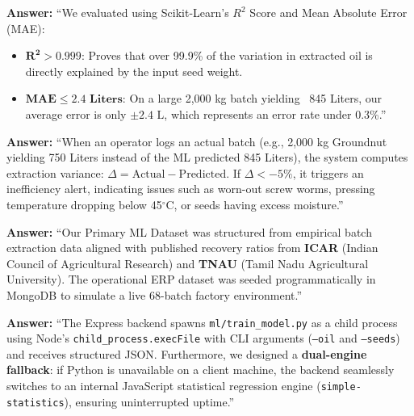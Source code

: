 \documentclass[11pt,a4paper]{article}
\begin{document}
\begin{qabox}
\textbf{Answer:} ``We evaluated using Scikit-Learn's $R^2$ Score and Mean Absolute Error (MAE):
\begin{itemize}[leftmargin=1.2em]
    \item $\mathbf{R^2 > 0.999}$: Proves that over 99.9\% of the variation in extracted oil is directly explained by the input seed weight.
    \item $\mathbf{\text{MAE} \le 2.4\text{ Liters}}$: On a large 2,000 kg batch yielding ~845 Liters, our average error is only $\pm 2.4\text{ L}$, which represents an error rate under 0.3\%.''
\end{itemize}
\end{qabox}

\begin{qabox}
\textbf{Answer:} ``When an operator logs an actual batch (e.g., 2,000 kg Groundnut yielding 750 Liters instead of the ML predicted 845 Liters), the system computes extraction variance: $\Delta = \text{Actual} - \text{Predicted}$. If $\Delta < -5\%$, it triggers an inefficiency alert, indicating issues such as worn-out screw worms, pressing temperature dropping below 45$^\circ$C, or seeds having excess moisture.''
\end{qabox}

\begin{qabox}
\textbf{Answer:} ``Our Primary ML Dataset was structured from empirical batch extraction data aligned with published recovery ratios from \textbf{ICAR} (Indian Council of Agricultural Research) and \textbf{TNAU} (Tamil Nadu Agricultural University). The operational ERP dataset was seeded programmatically in MongoDB to simulate a live 68-batch factory environment.''
\end{qabox}

\begin{qabox}
\textbf{Answer:} ``The Express backend spawns \texttt{ml/train\_model.py} as a child process using Node's \texttt{child\_process.execFile} with CLI arguments (\texttt{--oil} and \texttt{--seeds}) and receives structured JSON. Furthermore, we designed a \textbf{dual-engine fallback}: if Python is unavailable on a client machine, the backend seamlessly switches to an internal JavaScript statistical regression engine (\texttt{simple-statistics}), ensuring uninterrupted uptime.''
\end{qabox}
\end{document}
